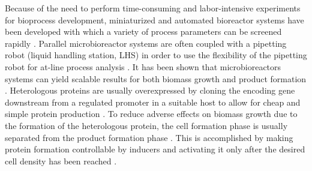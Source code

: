 \documentclass[sn-standardnature]{sn-jnl}%
\theoremstyle{thmstyleone}%
\theoremstyle{thmstyletwo}%
\theoremstyle{thmstylethree}%
\begin{document}
Because of the need to perform time-consuming and labor-intensive experiments for bioprocess development, miniaturized and automated bioreactor systems have been developed with which a variety of process parameters can be screened rapidly \cite{weuster2005parallel,hemmerich2018microbioreactor}.
Parallel microbioreactor systems are often coupled with a pipetting robot (liquid handling station, LHS) in order to use the flexibility of the pipetting robot for at-line process analysis \cite{haby2019integrated,puskeiler2005development,rohe2012automated}. It has been shown that microbioreactors systems can yield scalable results for both biomass growth and product formation \cite{puskeiler2005development,schmideder2016high,kensy2009scale}.
Heterologous proteins are usually overexpressed by cloning the encoding gene downstream from a regulated promoter in a suitable host to allow for cheap and simple protein production \cite{terpe2006overview}.
To reduce adverse effects on biomass growth due to the formation of the heterologous protein, the cell formation phase is usually separated from the product formation phase \cite{choi2000efficient,schmideder2016high,jahic2006process,neubauer2001expression}.
This is accomplished by making protein formation controllable by inducers and activating it only after the desired cell density has been reached \cite{neubauer2001expression}.
\end{document}

